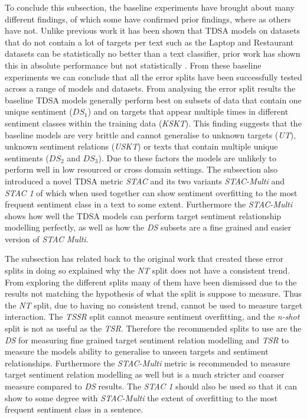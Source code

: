 To conclude this subsection, the baseline experiments have brought about many different findings, of which some have confirmed prior findings, where as others have not. Unlike previous work it has been shown that TDSA models on datasets that do not contain a lot of targets per text such as the Laptop and Restaurant datasets can be statistically no better than a text classifier, prior work has shown this in absolute performance but not statistically \citep{jiang-etal-2019-challenge}. From these baseline experiments we can conclude that all the error splits have been successfully tested across a range of models and datasets. From analysing the error split results the baseline TDSA models generally perform best on subsets of data that contain one unique sentiment ($DS_1$) and on targets that appear multiple times in different sentiment classes within the training data (\textit{KSKT}). This finding suggests that the baseline models are very brittle and cannot generalise to unknown targets (\textit{UT}), unknown sentiment relations (\textit{USKT}) or texts that contain multiple unique sentiments ($DS_2$ and $DS_3$). Due to these factors the models are unlikely to perform well in low resourced or cross domain settings. The subsection also introduced a novel TDSA metric \textit{STAC} and its two variants \textit{STAC-Multi} and \textit{STAC 1} of which when used together can show sentiment overfitting to the most frequent sentiment class in a text to some extent. Furthermore the \textit{STAC-Multi} shows how well the TDSA models can perform target sentiment relationship modelling perfectly, as well as how the \textit{DS} subsets are a fine grained and easier version of \textit{STAC Multi}.

The subsection has related back to the original work that created these error splits in doing so explained why the \textit{NT} split does not have a consistent trend. From exploring the different splits many of them have been dismissed due to the results not matching the hypothesis of what the split is suppose to measure. Thus the \textit{NT} split, due to having no consistent trend, cannot be used to measure target interaction. The \textit{TSSR} split cannot measure sentiment overfitting, and the \textit{n-shot} split is not as useful as the \textit{TSR}. Therefore the recommended splits to use are the \textit{DS} for measuring fine grained target sentiment relation modelling and \textit{TSR} to measure the models ability to generalise to unseen targets and sentiment relationships. Furthermore the \textit{STAC-Multi} metric is recommended to measure target sentiment relation modelling as well but is a much stricter and coarser measure compared to \textit{DS} results. The \textit{STAC 1} should also be used so that it can show to some degree with \textit{STAC-Multi} the extent of overfitting to the most frequent sentiment class in a sentence.

